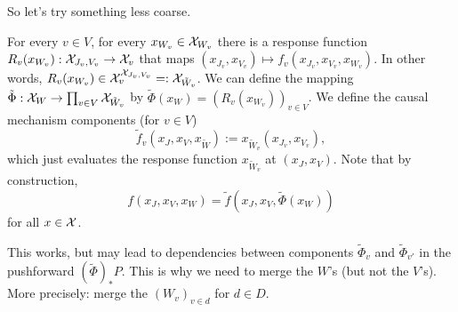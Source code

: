 {So let's try something less coarse.

For every $v \in V$, for every $x_{W_v} \in \mathcal{X}_{W_v}$ there is a response function $R_v(x_{W_v}) : \mathcal{X}_{J_v,V_v} \to \mathcal{X}_v$ that maps $(x_{J_v},x_{V_v}) \mapsto f_v(x_{J_v},x_{V_v},x_{W_v})$.
In other words, $R_v(x_{W_v}) \in \mathcal{X}_v^{\mathcal{X}_{J_v,V_v}} =: \mathcal{X}_{\tilde W_v}$.
We can define the mapping $\tilde\Phi : \mathcal{X}_W \to \prod_{v \in V} \mathcal{X}_{\tilde W_v}$ by
$\tilde\Phi(x_W) = (R_v(x_{W_v}))_{v \in V}$. 
We define the causal mechanism components (for $v \in V$)
$$\tilde{f}_v(x_J,x_V,x_{\tilde{W}}) := x_{\tilde W_v}(x_{J_v},x_{V_v}),$$
which just evaluates the response function $x_{\tilde{W}_v}$ at $(x_J,x_V)$. 
Note that by construction,
  $$f(x_J,x_V,x_W) = \tilde{f}(x_J,x_V,\tilde{\Phi}(x_W))$$
for all $x \in \mathcal{X}$.

This works, but may lead to dependencies between components $\tilde{\Phi}_v$ and $\tilde{\Phi}_{v'}$ in the pushforward $(\tilde\Phi)_* P$.
This is why we need to merge the $W$'s (but not the $V$'s).
More precisely: merge the $(W_v)_{v \in d}$ for $d \in D$.
}


